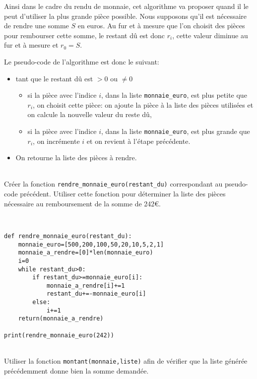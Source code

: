 Ainsi dans le cadre du rendu de monnaie, cet algorithme va proposer quand il le peut d'utiliser la plus grande pièce possible. Nous supposons qu'il est nécessaire de rendre une somme $S$ en euros. Au fur et à mesure que l'on choisit des pièces pour rembourser cette somme, le restant dû est donc $r_i$, cette valeur diminue au fur et à mesure et $r_0=S$.

Le pseudo-code de l'algorithme est donc le suivant:
\begin{itemize}
 \item tant que le restant dû est $>0$ ou $\neq 0$
 \begin{itemize}
	 \item si la pièce avec l'indice $i$, dans la liste \verb?monnaie_euro?, est plus petite que $r_i$, on choisit cette pièce: on ajoute la pièce à la liste des pièces utilisées et on calcule la nouvelle valeur du reste dû,
 	 \item si la pièce avec l'indice $i$, dans la liste \verb?monnaie_euro?, est plus grande que $r_i$, on incrémente $i$ et on revient à l'étape précédente.
 \end{itemize}
 \item On retourne la liste des pièces à rendre.
\end{itemize}

\begin{exercice}~\\
Créer la fonction \verb?rendre_monnaie_euro(restant_du)? correspondant au pseudo-code précédent. Utiliser cette fonction pour déterminer la liste des pièces nécessaire au remboursement de la somme de 242\euro.
\end{exercice}

\begin{solution}~\ \\
\begin{verbatim}
def rendre_monnaie_euro(restant_du):
    monnaie_euro=[500,200,100,50,20,10,5,2,1]
    monnaie_a_rendre=[0]*len(monnaie_euro)
    i=0
    while restant_du>0:
        if restant_du>=monnaie_euro[i]:
            monnaie_a_rendre[i]+=1
            restant_du+=-monnaie_euro[i]
        else:
            i+=1
    return(monnaie_a_rendre)

print(rendre_monnaie_euro(242))
\end{verbatim}
\end{solution}

\begin{exercice}~\\
Utiliser la fonction \verb?montant(monnaie,liste)? afin de vérifier que la liste générée précédemment donne bien la somme demandée.
\end{exercice}


